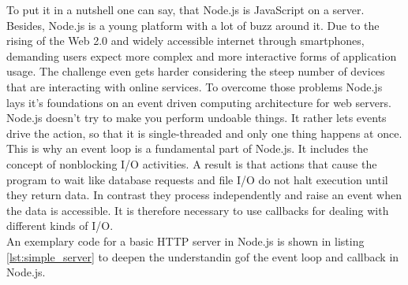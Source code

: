 To put it in a nutshell one can say, that Node.js is JavaScript on a server.\\
Besides, Node.js is a young platform with a lot of buzz around it. Due to the
rising of the Web 2.0 and widely accessible internet through smartphones,
demanding users expect more complex and more interactive forms of application usage. 
The challenge even gets harder considering the steep number of
devices that are interacting with online services.%
To overcome those problems Node.js lays it's foundations on an event driven
computing architecture for web servers.\\
Node.js doesn't try to make you perform undoable things. It rather lets events drive the
action, so that it is single-threaded and only one thing happens at once. This
is why an event loop is a fundamental part of Node.js. It includes the concept
of nonblocking I/O activities. A result is that actions that cause the program
to wait like database requests and file I/O  do not halt execution until they
return data. In contrast they process independently and raise an event when the
data is accessible. It is therefore necessary to use callbacks for dealing with
different kinds of I/O.\\
An exemplary code for a basic HTTP server in Node.js is shown in listing
\ref{lst:simple_server} to deepen the understandin gof the event loop and
callback in Node.js.





